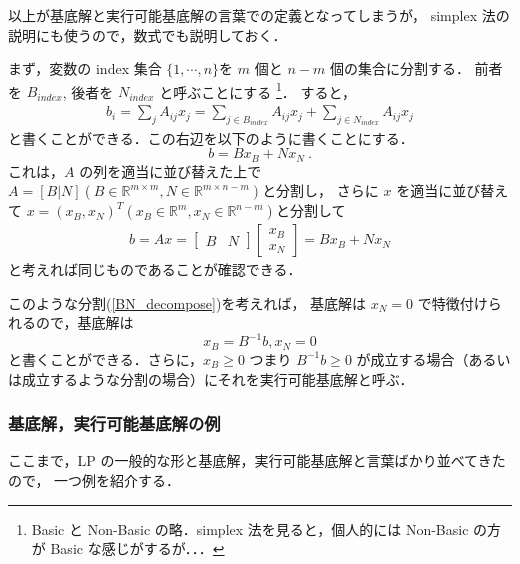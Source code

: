 \documentclass[11pt, a4]{article}
\begin{document}
以上が基底解と実行可能基底解の言葉での定義となってしまうが，
simplex 法の説明にも使うので，数式でも説明しておく．

まず，変数の index 集合 $\{1, \cdots, n\}$を $m$ 個と $n - m$ 個の集合に分割する．
前者を $B_{index}$, 後者を $N_{index}$ と呼ぶことにする
\footnote{Basic と Non-Basic の略．simplex 法を見ると，個人的には Non-Basic の方が Basic な感じがするが．．．}．
すると，
\begin{eqnarray}
  b_i = \sum_j A_{ij} x_j = \sum_{j\in B_{index}}A_{ij}x_j + \sum_{j \in N_{index}}A_{ij}x_j
\end{eqnarray}
と書くことができる．この右辺を以下のように書くことにする．
\begin{equation}
  b = Bx_B + Nx_N\ .
\end{equation}
これは，$A$ の列を適当に並び替えた上で $A = [B|N] (B \in \mathbb{R}^{m\times m}, N \in \mathbb{R}^{m\times n - m})$と分割し，
さらに $x$ を適当に並び替えて $x = (x_B, x_N)^{T}(x_B \in \mathbb{R}^m, x_N \in \mathbb{R}^{n -m})$と分割して
\begin{eqnarray}
  b = Ax = \left[
    \begin{array}{c|c}
      B&N
    \end{array}
    \right]
  \left[
    \begin{array}{c}
      x_B\\
      x_N
    \end{array}
    \right] = Bx_B + N x_N
  \label{BN_decompose}
\end{eqnarray}
と考えれば同じものであることが確認できる．

このような分割(\ref{BN_decompose})を考えれば，
基底解は $x_N = 0$ で特徴付けられるので，基底解は
\begin{equation}
  x_B = B^{-1}b, x_N = 0
\end{equation}
と書くことができる．さらに，$x_B \geq 0$ つまり $B^{-1} b\geq 0$ が成立する場合（あるいは成立するような分割の場合）にそれを実行可能基底解と呼ぶ．

\subsubsection{基底解，実行可能基底解の例}
ここまで，LP の一般的な形と基底解，実行可能基底解と言葉ばかり並べてきたので，
一つ例を紹介する．
\end{document}
